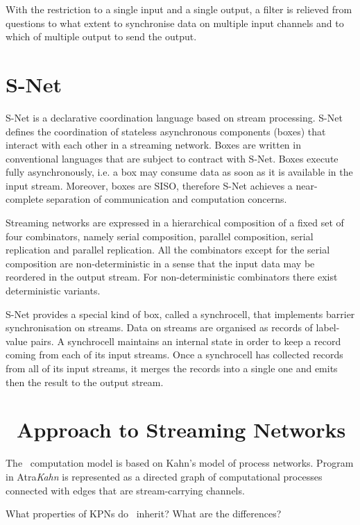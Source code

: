 With the restriction to a single input and a single output, a filter is relieved from questions to what extent to synchronise data on multiple input channels and to which of multiple output to send the output.


    \section{S-Net}
S-Net \cite{snet_intro} is a declarative coordination language based on stream processing. S-Net defines the coordination of stateless asynchronous components (boxes) that interact with each other in a streaming network. Boxes are written in conventional languages that are subject to contract with S-Net. Boxes execute fully asynchronously, i.e. a box may consume data as soon as it is available in the input stream. Moreover, boxes are SISO, therefore S-Net achieves a near-complete separation of communication and computation concerns.

Streaming networks are expressed in a hierarchical composition of a fixed set of four combinators, namely serial composition, parallel composition, serial replication and parallel replication. All the combinators except for the serial composition are non-deterministic in a sense that the input data may be reordered in the output stream. For non-deterministic combinators there exist deterministic variants.

S-Net provides a special kind of box, called a synchrocell, that implements barrier synchronisation on streams. Data on streams are organised as records of label-value pairs. A synchrocell maintains an internal state in order to keep a record coming from each of its input streams. Once a synchrocell has collected records from all of its input streams, it merges the records into a single one and emits then the result to the output stream.


    \section{\ak\ Approach to Streaming Networks}
The \ak\ computation model is based on Kahn's model of process networks. Program in Atra\emph{Kahn} is represented as a directed graph of computational processes connected with edges that are stream-carrying channels.

What properties of KPNs do \ak\ inherit? What are the differences?



